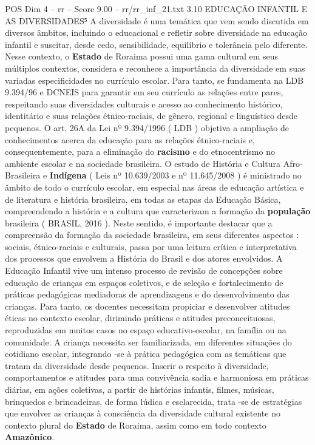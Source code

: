 \begin{textsample}{POS Dim 4 – rr – Score 9.00 – rr/rr\_inf\_21.txt}  \label{ex:f4_pos_120}
3.10 EDUCAÇÃO INFANTIL E AS DIVERSIDADES⁵ A diversidade é uma temática que vem sendo discutida em diversos âmbitos, incluindo o educacional e refletir sobre diversidade na educação infantil e suscitar, desde cedo, sensibilidade, equilíbrio e tolerância pelo diferente.
Nesse contexto, o \textbf{Estado} de Roraima possui uma gama cultural em seus múltiplos contextos, considera e reconhece a importância da diversidade em suas variadas especificidades no currículo escolar.
Para tanto, se fundamenta na LDB 9.394/96 e DCNEIS para garantir em seu currículo as relações entre pares, respeitando suas diversidades culturais e acesso ao conhecimento histórico, identitário e suas relações étnico-raciais, de gênero, regional e linguístico desde pequenos.
O art. 26A da Lei nº 9.394/1996 ( LDB ) objetiva a ampliação de conhecimentos acerca da educação para as relações étnico-raciais e, consequentemente, para a eliminação do \textbf{racismo} e do etnocentrismo no ambiente escolar e na sociedade brasileira.
O estudo de História e Cultura Afro-Brasileira e \textbf{Indígena} ( Leis nº 10.639/2003 e nº 11.645/2008 ) é ministrado no âmbito de todo o currículo escolar, em especial nas áreas de educação artística e de literatura e história brasileira, em todas as etapas da Educação Básica, compreendendo a história e a cultura que caracterizam a formação da \textbf{população} brasileira ( BRASIL, 2016 ).
Neste sentido, é importante destacar que a compreensão da formação da sociedade brasileira, em seus diferentes aspectos : sociais, étnico-raciais e culturais, passa por uma leitura crítica e interpretativa dos processos que envolvem a História do Brasil e dos atores envolvidos.
A Educação Infantil vive um intenso processo de revisão de concepções sobre educação de crianças em espaços coletivos, e de seleção e fortalecimento de práticas pedagógicas mediadoras de aprendizagens e do desenvolvimento das crianças.
Para tanto, os docentes necessitam propiciar e desenvolver atitudes éticas no contexto escolar, dirimindo práticas e atitudes preconceituosas, reproduzidas em muitos casos no espaço educativo-escolar, na família ou na comunidade.
A criança necessita ser familiarizada, em diferentes situações do cotidiano escolar, integrando -se à prática pedagógica com as temáticas que tratam da diversidade desde pequenos.
Inserir o respeito à diversidade, comportamentos e atitudes para uma convivência sadia e harmoniosa em práticas diárias, em ações coletivas, a partir de histórias infantis, filmes, músicas, brinquedos e brincadeiras, de forma lúdica e esclarecida, trata -se de estratégias que envolver as crianças à consciência da diversidade cultural existente no contexto plural do \textbf{Estado} de Roraima, assim como em todo contexto \textbf{Amazônico}.

\end{textsample}
